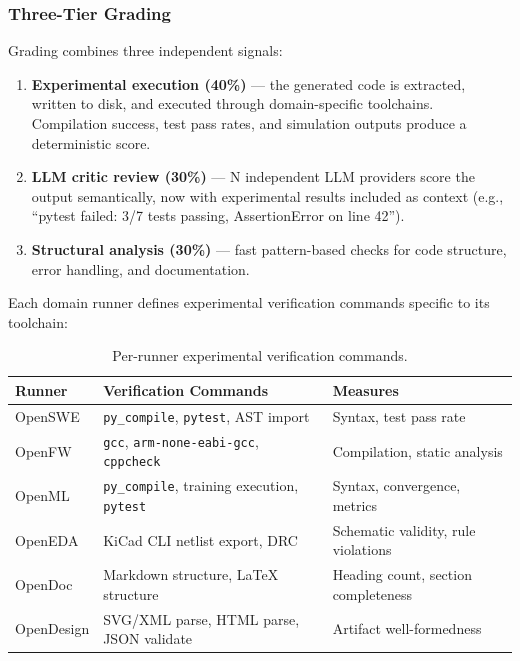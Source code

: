 \documentclass[11pt,a4paper]{article}
\begin{document}
\subsubsection{Three-Tier Grading}

Grading combines three independent signals:

\begin{enumerate}[noitemsep]
    \item \textbf{Experimental execution (40\%)} --- the generated code is extracted, written to disk, and executed through domain-specific toolchains. Compilation success, test pass rates, and simulation outputs produce a deterministic score.
    \item \textbf{LLM critic review (30\%)} --- N independent LLM providers score the output semantically, now with experimental results included as context (e.g., ``pytest failed: 3/7 tests passing, AssertionError on line 42'').
    \item \textbf{Structural analysis (30\%)} --- fast pattern-based checks for code structure, error handling, and documentation.
\end{enumerate}

Each domain runner defines experimental verification commands specific to its toolchain:

\begin{table}[h]
\centering
\small
\caption{Per-runner experimental verification commands.}
\label{tab:exp-verify}
\begin{tabular}{@{}lll@{}}
\toprule
Runner & Verification Commands & Measures \\
\midrule
OpenSWE    & \texttt{py\_compile}, \texttt{pytest}, AST import & Syntax, test pass rate \\
OpenFW     & \texttt{gcc}, \texttt{arm-none-eabi-gcc}, \texttt{cppcheck} & Compilation, static analysis \\
OpenML     & \texttt{py\_compile}, training execution, \texttt{pytest} & Syntax, convergence, metrics \\
OpenEDA    & KiCad CLI netlist export, DRC & Schematic validity, rule violations \\
OpenDoc    & Markdown structure, \LaTeX{} structure & Heading count, section completeness \\
OpenDesign & SVG/XML parse, HTML parse, JSON validate & Artifact well-formedness \\
\bottomrule
\end{tabular}
\end{table}
\end{document}
